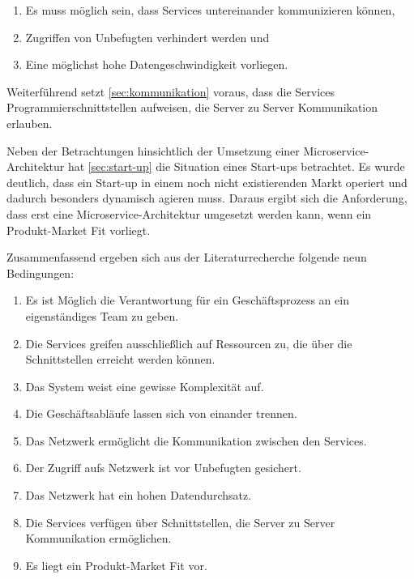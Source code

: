 \begin{enumerate}
	\item Es muss möglich sein, dass Services untereinander kommunizieren können,
	\item Zugriffen von Unbefugten verhindert werden und
	\item Eine möglichst hohe Datengeschwindigkeit vorliegen.
\end{enumerate}

Weiterführend setzt \cref{sec:kommunikation} voraus, dass die Services Programmierschnittstellen aufweisen, die Server zu Server Kommunikation erlauben.

Neben der Betrachtungen hinsichtlich der Umsetzung einer Microservice-Architektur hat \cref{sec:start-up} die Situation eines Start-ups betrachtet. Es wurde deutlich, dass ein Start-up in einem noch nicht existierenden Markt operiert und dadurch besonders dynamisch agieren muss. Daraus ergibt sich die Anforderung, dass erst eine Microservice-Architektur umgesetzt werden kann, wenn ein Produkt-Market Fit vorliegt.

Zusammenfassend ergeben sich aus der Literaturrecherche folgende neun Bedingungen:

\begin{enumerate}
	\item Es ist Möglich die Verantwortung für ein Geschäftsprozess an ein eigenständiges Team zu geben.
	\item Die Services greifen ausschließlich auf Ressourcen zu, die über die Schnittstellen erreicht werden können.
	\item Das System weist eine gewisse Komplexität auf.
	\item Die Geschäftsabläufe lassen sich von einander trennen.
	\item Das Netzwerk ermöglicht die Kommunikation zwischen den Services.
	\item Der Zugriff aufs Netzwerk ist vor Unbefugten gesichert.
	\item Das Netzwerk hat ein hohen Datendurchsatz.
	\item Die Services verfügen über Schnittstellen, die Server zu Server Kommunikation ermöglichen.
	\item Es liegt ein Produkt-Market Fit vor.
\end{enumerate}